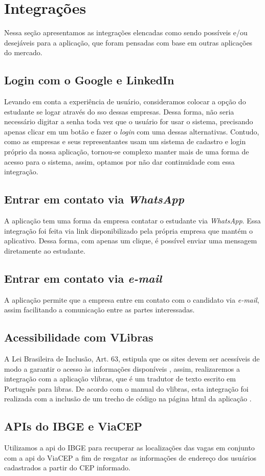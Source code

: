 \section{Integrações}
Nessa seção apresentamos as integrações elencadas como sendo possíveis e/ou desejáveis para a aplicação, que foram pensadas com base em outras aplicações do mercado.

\subsection{Login com o Google e LinkedIn}
Levando em conta a experiência de usuário, consideramos colocar a opção do estudante se logar através do \ac{sso} dessas empresas. Dessa forma, não seria necessário digitar a senha toda vez que o usuário for usar o sistema, precisando apenas clicar em um botão e fazer o \textit{login} com uma dessas alternativas. Contudo, como as empresas e seus representantes usam um sistema de cadastro e login próprio da nossa aplicação, tornou-se complexo manter mais de uma forma de acesso para o sistema, assim, optamos por não dar continuidade com essa integração.

\subsection{Entrar em contato via \textit{WhatsApp}}
A aplicação tem uma forma da empresa contatar o estudante via \textit{WhatsApp}. Essa integração foi feita via link disponibilizado pela própria empresa que mantém o aplicativo. Dessa forma, com apenas um clique, é possível enviar uma mensagem diretamente ao estudante.

\subsection{Entrar em contato via \textit{e-mail}}
A aplicação permite que a empresa entre em contato com o candidato via \textit{e-mail}, assim facilitando a comunicação entre as partes interessadas.

\subsection{Acessibilidade com VLibras}
A Lei Brasileira de Inclusão, Art. 63, estipula que os sites devem ser acessíveis de modo a garantir o acesso às informações disponíveis \cite{leiinclusao}, assim, realizaremos a integração com a aplicação \gls{vlibras}, que é um tradutor de texto escrito em Português para \ac{libras}. De acordo com o manual do \gls{vlibras}, esta integração foi realizada com a inclusão de um trecho de código na página \ac{html} da aplicação \cite{manualvlibras}.

\subsection{APIs do IBGE e ViaCEP}
Utilizamos a \ac{api} do IBGE para recuperar as localizações das vagas em conjunto com a \ac{api} do ViaCEP a fim de resgatar as informações de endereço dos usuários cadastrados a partir do CEP informado.
